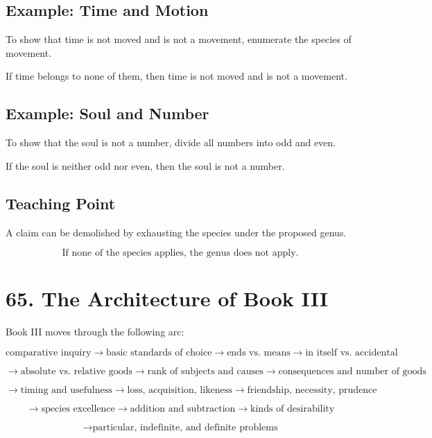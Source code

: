 \documentclass[12pt]{article}
\begin{document}
\subsection*{Example: Time and Motion}

To show that time is not moved and is not a movement, enumerate the species of
movement.

If time belongs to none of them, then time is not moved and is not a movement.

\subsection*{Example: Soul and Number}

To show that the soul is not a number, divide all numbers into odd and even.

If the soul is neither odd nor even, then the soul is not a number.

\subsection*{Teaching Point}

A claim can be demolished by exhausting the species under the proposed genus.

\[
\boxed{
\text{If none of the species applies, the genus does not apply.}
}
\]

\section*{65. The Architecture of Book III}

Book III moves through the following arc:

\[
\text{comparative inquiry}
\rightarrow
\text{basic standards of choice}
\rightarrow
\text{ends vs. means}
\rightarrow
\text{in itself vs. accidental}
\]

\[
\rightarrow
\text{absolute vs. relative goods}
\rightarrow
\text{rank of subjects and causes}
\rightarrow
\text{consequences and number of goods}
\]

\[
\rightarrow
\text{timing and usefulness}
\rightarrow
\text{loss, acquisition, likeness}
\rightarrow
\text{friendship, necessity, prudence}
\]

\[
\rightarrow
\text{species excellence}
\rightarrow
\text{addition and subtraction}
\rightarrow
\text{kinds of desirability}
\]

\[
\rightarrow
\text{particular, indefinite, and definite problems}
\]
\end{document}
